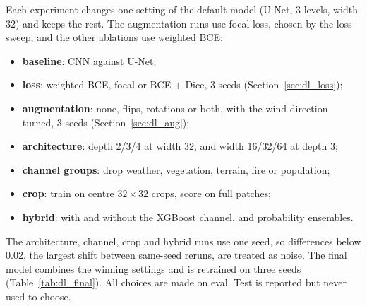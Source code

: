 Each experiment changes one setting of the default model (U-Net, 3 levels, width 32) and keeps the
rest. The augmentation runs use focal loss, chosen by the loss sweep, and the other ablations use
weighted BCE:
\begin{itemize}
\item \textbf{baseline}: CNN against U-Net;
\item \textbf{loss}: weighted BCE, focal or BCE + Dice, 3 seeds (Section~\ref{sec:dl_loss});
\item \textbf{augmentation}: none, flips, rotations or both, with the wind direction turned, 3 seeds
(Section~\ref{sec:dl_aug});
\item \textbf{architecture}: depth 2/3/4 at width 32, and width 16/32/64 at depth 3;
\item \textbf{channel groups}: drop weather, vegetation, terrain, fire or population;
\item \textbf{crop}: train on centre $32\times32$ crops, score on full patches;
\item \textbf{hybrid}: with and without the XGBoost channel, and probability ensembles.
\end{itemize}
The architecture, channel, crop and hybrid runs use one seed, so differences below 0.02, the largest
shift between same-seed reruns, are treated as noise. The final model combines the winning settings and
is retrained on three seeds (Table~\ref{tab:dl_final}). All choices are made on eval. Test is reported
but never used to choose.

